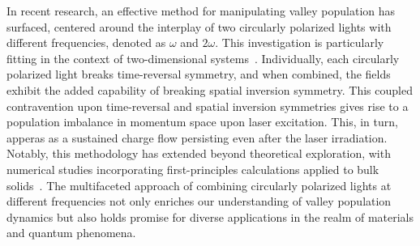 In recent research, an effective method for manipulating valley population has surfaced, centered
around the interplay of two circularly polarized lights with different frequencies, denoted as
$\omega$ and $2\omega$. This investigation is particularly fitting in the context of
two-dimensional systems~\cite{Jimenez-Galan2020,Mrudul:21}. Individually, each circularly polarized
light breaks time-reversal symmetry, and when combined, the fields exhibit the added capability of
breaking spatial inversion symmetry. This coupled contravention upon time-reversal and spatial
inversion symmetries gives rise to a population imbalance in momentum space upon laser excitation.
This, in turn, apperas as a sustained charge flow persisting even after the laser irradiation. Notably, this methodology has extended beyond theoretical exploration, with numerical studies incorporating first-principles calculations applied to bulk solids~\cite{PhysRevLett.127.126601}. The multifaceted approach of combining circularly polarized lights at different frequencies not only enriches our understanding of valley population dynamics but also holds promise for diverse applications in the realm of materials and quantum phenomena.
